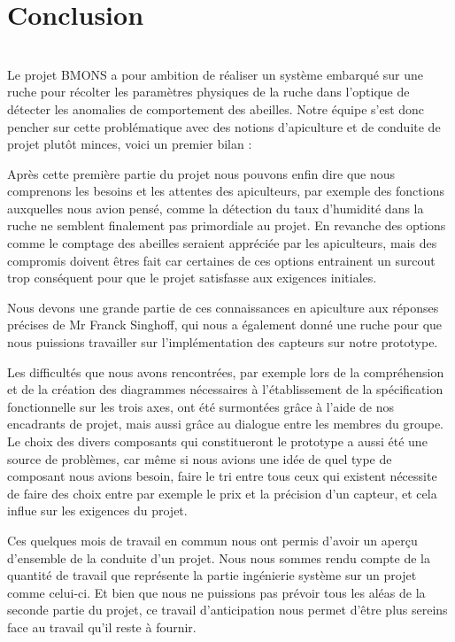 \chapter{Conclusion}\\

Le projet BMONS a pour ambition de réaliser un système embarqué sur une ruche pour récolter les paramètres physiques de la ruche dans l’optique de détecter les anomalies de comportement des abeilles. Notre équipe s’est donc pencher sur cette problématique avec des notions d’apiculture et de conduite de projet plutôt minces, voici un premier bilan :

Après cette première partie du projet nous pouvons enfin dire que nous comprenons les besoins et les attentes des apiculteurs, par exemple des fonctions auxquelles nous avion pensé, comme la détection du taux d'humidité dans la ruche ne semblent finalement pas primordiale au projet. En revanche des options comme le comptage des abeilles seraient appréciée par les apiculteurs, mais des compromis doivent êtres fait car certaines de ces options entrainent un surcout trop conséquent pour que le projet satisfasse aux exigences initiales.\newline 

Nous devons une grande partie de ces connaissances en apiculture aux réponses précises de Mr Franck Singhoff, qui nous a également donné une ruche pour que nous puissions travailler sur l'implémentation des capteurs sur notre prototype. \newline 

Les difficultés que nous avons rencontrées, par exemple lors de la compréhension et de la création des diagrammes nécessaires à l’établissement de la spécification fonctionnelle sur les trois axes, ont été surmontées grâce à l’aide de nos encadrants de projet, mais aussi grâce au dialogue entre les membres du groupe. Le choix des divers composants qui constitueront le prototype a aussi été une source de problèmes, car même si nous avions une idée de quel type de composant nous avions besoin, faire le tri entre tous ceux qui existent nécessite de faire des choix entre par exemple le prix et la précision d’un capteur, et cela influe sur les exigences du projet. \newline

Ces quelques mois de travail en commun nous ont permis d'avoir un aperçu d'ensemble de la conduite d'un projet. Nous nous sommes rendu compte de la quantité de travail que représente la partie ingénierie système sur un projet comme celui-ci. Et bien que nous ne puissions pas prévoir tous les aléas de la seconde partie du projet, ce travail d'anticipation nous permet d'être plus sereins face au travail qu'il reste à fournir.\newline​


